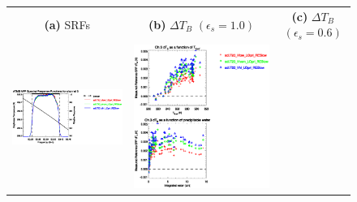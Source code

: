 \begin{figure}[H]
  \centering
  \begin{tabular}{c c c}
    \textsf{\textbf{(a)} SRFs} &
    \textsf{\textbf{(b)} $\Delta T_B$ $(\epsilon_s = 1.0)$} &
    \textsf{\textbf{(c)} $\Delta T_B$ $(\epsilon_s = 0.6)$} \\
    \includegraphics[bb=80 400 280 558,clip,scale=0.85]{graphics/srf/Vset/atms_npp.ch3.osrf.eps} &
    \includegraphics[bb=85 400 260 558,clip,scale=0.85]{graphics/dtb/Vset/e1.0_r0.0/atms_npp.ch3.dTb.eps} & 

\end{tabular}
\end{figure}
